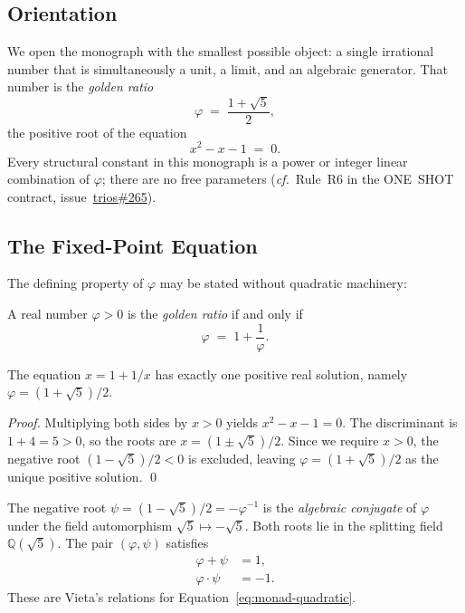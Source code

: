 \subsection{Orientation}

We open the monograph with the smallest possible object: a single irrational
number that is simultaneously a unit, a limit, and an algebraic generator.
That number is the \emph{golden ratio}
\[
  \varphi \;=\; \frac{1+\sqrt{5}}{2},
\]
the positive root of the equation
\begin{equation}\label{eq:monad-quadratic}
  x^{2} - x - 1 \;=\; 0.
\end{equation}
Every structural constant in this monograph is a power or integer linear
combination of $\varphi$; there are no free parameters
(\emph{cf.}~Rule~R6 in the ONE~SHOT contract, issue~\href{https://github.com/gHashTag/trios/issues/265}{trios\#265}).

\subsection{The Fixed-Point Equation}

The defining property of $\varphi$ may be stated without quadratic
machinery:

\begin{definition}[Fixed point of $x = 1 + 1/x$]\label{def:phi-fixed-point}
  A real number $\varphi > 0$ is the \emph{golden ratio} if and only if
  \begin{equation}\label{eq:monad-fixed-point}
    \varphi \;=\; 1 + \frac{1}{\varphi}.
  \end{equation}
\end{definition}

\begin{proposition}\label{prop:fp-unique}
  The equation $x = 1 + 1/x$ has exactly one positive real solution,
  namely $\varphi = (1+\sqrt{5})/2$.
\end{proposition}

\begin{proof}
  Multiplying both sides by $x > 0$ yields $x^{2} - x - 1 = 0$.
  The discriminant is $1 + 4 = 5 > 0$, so the roots are
  $x = (1 \pm \sqrt{5})/2$.
  Since we require $x > 0$, the negative root $(1-\sqrt{5})/2 < 0$ is
  excluded, leaving $\varphi = (1+\sqrt{5})/2$ as the unique positive
  solution.
  \qed
\end{proof}

The negative root $\psi = (1-\sqrt{5})/2 = -\varphi^{-1}$ is the
\emph{algebraic conjugate} of $\varphi$ under the field automorphism
$\sqrt{5} \mapsto -\sqrt{5}$.
Both roots lie in the splitting field $\mathbb{Q}(\sqrt{5})$.
The pair $(\varphi, \psi)$ satisfies
\begin{align}
  \varphi + \psi &= 1, \label{eq:vieta-sum}\\
  \varphi \cdot \psi &= -1. \label{eq:vieta-product}
\end{align}
These are Vieta's relations for Equation~\eqref{eq:monad-quadratic}.

